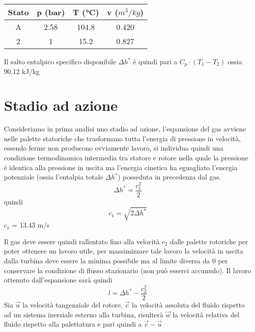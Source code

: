 \documentclass[a4paper,12pt]{article}
\begin{document}
\begin{center}
    \begin{tabular}{c|c|c|c}
        Stato   &p (bar)    &T (°C) &v ($m^3/kg$) \\ \hline
        A       &2.58       &104,8  &0.420  \\
        2       &1          &15.2   &0.827  
    \end{tabular}
\end{center}
Il salto entalpico specifico disponibile $\Delta h^*$ è quindi pari a $C_p \cdot (T_1-T_2)$ ossia 90.12 kJ/kg

\section{Stadio ad azione}
\label{sec:stadio_ad_azione}
Consideriamo in prima analisi uno stadio ad azione, l'espansione del gas avviene nelle palette statoriche che trasformano tutta l'energia di pressione in velocità,
essendo ferme non producono ovviamente lavoro, si individua quindi una condizione termodinamica intermedia tra statore e rotore nella quale la pressione è identica
alla pressione in uscita ma l'energia cinetica ha eguagliato l'energia potenziale (ossia l'entalpia totale $\Delta h^*$) posseduta in precedenza dal gas.
\begin{equation}
    \label{eq:entalpia_stadio_azione}
    \Delta h^* = \frac{c_1^2}{2}
\end{equation}
quindi
\begin{equation}
    \label{eq:vel_stadio_azione}
    c_1 = \sqrt{2\Delta h^*}    
\end{equation}
$c_1$ = 13.43 m/s

Il gas deve essere quindi rallentato fino alla velocità $c_2$ dalle palette rotoriche per poter ottenere un lavoro utile, per massimizzare tale lavoro la velocità
in uscita dalla turbina deve essere la minima possibile ma al limite diversa da 0 per conservare la condizione di flusso stazionario (non può esserci accumulo).
Il lavoro ottenuto dall'espansione sarà quindi
\begin{equation}
    l = \Delta h^* - \frac{c_2^2}{2}
\end{equation}
Sia $\vec u$ la velocità tangenziale del rotore, $\vec c$ la velocità assoluta del fluido rispetto ad un sistema inerziale esterno alla turbina,
risulterà $\vec w$ la velocità relativa del fluido rispetto alla palettatura e pari quindi a  $\vec c - \vec u$
\end{document}
